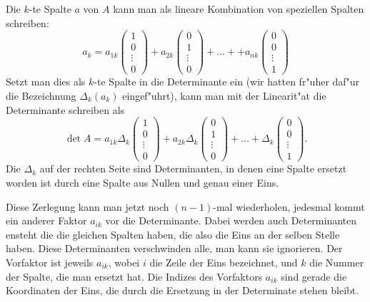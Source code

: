 Die $k$-te Spalte $a$ von $A$ kann man als lineare Kombination von
speziellen Spalten schreiben:
\[
a_k=a_{1k}
\begin{pmatrix}
1\\0\\\vdots\\0
\end{pmatrix}
+a_{2k}
\begin{pmatrix}
0\\1\\\vdots\\0
\end{pmatrix}
+\dots+
+a_{nk}
\begin{pmatrix}
0\\0\\\vdots\\1
\end{pmatrix}
\]
Setzt man dies als $k$-te Spalte in die Determinante ein (wir hatten fr"uher
daf"ur die Bezeichnung $\Delta_k(a_k)$ eingef"uhrt), kann man mit
der Linearit"at  die Determinante schreiben als
\[
\det A=a_{1k}\Delta_k\left(
\begin{matrix}
1\\0\\\vdots\\0
\end{matrix}
\right)
+a_{2k}
\Delta_k\left(
\begin{matrix}
0\\1\\\vdots\\0
\end{matrix}
\right)+\dots+
\Delta_k\left(
\begin{matrix}
0\\0\\\vdots\\1
\end{matrix}
\right).
\]
Die $\Delta_k$ auf der rechten Seite sind Determinanten, in denen 
eine Spalte ersetzt worden ist durch eine Spalte aus Nullen und genau
einer Eins.

Diese Zerlegung kann man jetzt noch $(n-1)$-mal wiederholen,
jedesmal kommt ein anderer Faktor $a_{ik}$ vor die Determinante.
Dabei werden auch Determinanten ensteht die die gleichen Spalten
haben, die also die Eins an der selben Stelle haben. Diese Determinanten
verschwinden alle, man kann sie ignorieren. Der Vorfaktor ist
jeweils $a_{ik}$, wobei $i$ die Zeile der Eins bezeichnet, und $k$
die Nummer der Spalte, die man ersetzt hat. Die Indizes des
Vorfaktors $a_{ik}$ sind gerade die Koordinaten der Eins, die durch
die Ersetzung in der Determinate stehen bleibt.

